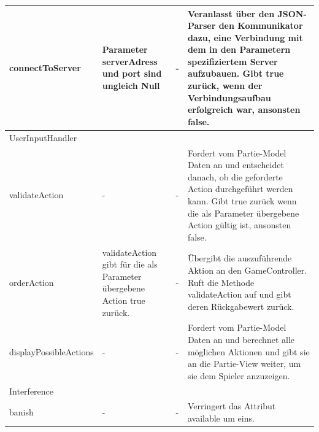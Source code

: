 \begin{center}
	\begin{tabular}{|p{4.7cm}|p{3.5cm}|p{3.5cm}|p{4.3cm}|}	
		\hline
		connectToServer & Parameter serverAdress und port sind ungleich Null & - & Veranlasst über den JSON-Parser den Kommunikator dazu, eine Verbindung mit dem in den Parametern spezifiziertem Server aufzubauen. Gibt true zurück, wenn der Verbindungsaufbau erfolgreich war, ansonsten false.\\\hline
		\multicolumn{4}{|l|}{UserInputHandler} \\\hline
		validateAction & - & - & Fordert vom Partie-Model Daten an und entscheidet danach, ob die geforderte Action durchgeführt werden kann. Gibt true zurück wenn die als Parameter übergebene Action gültig ist, ansonsten false.\\\hline
		orderAction & validateAction gibt für die als Parameter übergebene Action true zurück. & - & Übergibt die auszuführende Aktion an den GameController. Ruft die Methode validateAction auf und gibt deren Rückgabewert zurück.\\\hline
		displayPossibleActions & - & - & Fordert vom Partie-Model Daten an und berechnet alle möglichen Aktionen und gibt sie an die Partie-View weiter, um sie dem Spieler anzuzeigen.\\\hline
		\multicolumn{4}{|l|}{Interference} \\\hline
		banish & - & - & Verringert das Attribut available um eins.\\\hline
		
	\end{tabular}
\end{center}

